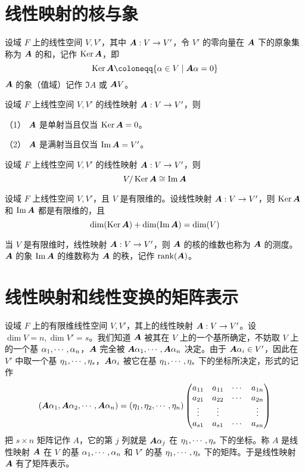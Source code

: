 \section{线性映射的核与象}

\begin{definition}[核] 
    设域 $F$ 上的线性空间 $V,V'$，其中 $\boldsymbol{A} : V \to V'$，令 $V'$ 的零向量在 $\boldsymbol{A}$ 下的原象集称为 $\boldsymbol{A}$ 的和，记作 $\operatorname{Ker} \boldsymbol{A}$，即
    \[ \Ker \bfA \coloneqq \{ \alpha \in V \mid \bfA\alpha = 0 \} \]
    $\boldsymbol{A}$ 的象（值域）记作 $\Im A$ 或 $\boldsymbol{A} V$。
\end{definition}

\begin{proposition}
    设域 $F$ 上线性空间 $V,V'$ 的线性映射 $\boldsymbol{A} : V \to V'$，则
    
    （1） $\boldsymbol{A}$ 是单射当且仅当 $\operatorname{Ker} \boldsymbol{A} = 0$。
    
    （2） $\boldsymbol{A}$ 是满射当且仅当 $\operatorname{Im} \boldsymbol{A} = V'$。
\end{proposition}

\begin{theorem}
    设域 $F$ 上线性空间 $V,V'$ 的线性映射 $\boldsymbol{A} : V \to V'$，则
    \[ V / \operatorname{Ker} \boldsymbol{A} \cong \operatorname{Im} \boldsymbol{A} \]
\end{theorem}

\begin{theorem}
    设域 $F$ 上线性空间 $V,V'$，且 $V$ 是有限维的。设线性映射 $\boldsymbol{A} : V \to V'$，则 $\operatorname{Ker} \boldsymbol{A}$ 和 $\operatorname{Im} \boldsymbol{A}$ 都是有限维的，且
    \[ \dim(\operatorname{Ker} \boldsymbol{A}) + \dim(\operatorname{Im} \boldsymbol{A}) = \dim(V) \]
\end{theorem}

当 $V$ 是有限维时，线性映射 $\boldsymbol{A} : V \to V'$，则 $\boldsymbol{A}$ 的核的维数也称为 $\boldsymbol{A}$ 的测度。$\boldsymbol{A}$ 的象 $\operatorname{Im} \boldsymbol{A}$ 的维数称为 $\boldsymbol{A}$ 的秩，记作 $\operatorname{rank}(\boldsymbol{A})$。

\section{线性映射和线性变换的矩阵表示}

设域 $F$ 上的有限维线性空间 $V,V'$，其上的线性映射 $\boldsymbol{A} : V \to V'$。设 $\dim V = n,\dim V' = s$。我们知道 $\boldsymbol{A}$ 被其在 $V$ 上的一个基所确定，不妨取 $V$ 上的一个基 $\alpha_1,\cdots,\alpha_n$，$\boldsymbol{A}$ 完全被 $\boldsymbol{A} \alpha_1,\cdots,\boldsymbol{A} \alpha_n$ 决定。由于 $\boldsymbol{A} \alpha_i \in V'$，因此在 $V'$ 中取一个基 $\eta_1,\cdots,\eta_s$，$\boldsymbol{A} \alpha_i$ 被它在基 $\eta_1,\cdots,\eta_s$ 下的坐标所决定，形式的记作
\[ 
    \left( \boldsymbol{A} \alpha_1 , \boldsymbol{A} \alpha_2 , \cdots , \boldsymbol{A} \alpha_n \right) = 
    \left( \eta_1 , \eta_2 , \cdots , \eta_n \right)
    \left( \begin{matrix}
            a_{11} & a_{11} & \cdots & a_{1n} \\
            a_{21} & a_{22} & \cdots & a_{2n} \\
            \vdots & \vdots &        & \vdots \\
            a_{s1} & a_{s1} & \cdots & a_{sn}
        \end{matrix} \right)
\]
把 $s\times n$ 矩阵记作 $A$，它的第 $j$ 列就是 $\boldsymbol{A} \alpha_j$ 在 $\eta_1,\cdots,\eta_s$ 下的坐标。称 $A$ 是线性映射 $\boldsymbol{A}$ 在 $V$ 的基 $\alpha_1,\cdots,\alpha_n$ 和 $V'$ 的基 $\eta_1,\cdots,\eta_s$ 下的矩阵。于是线性映射 $\boldsymbol{A}$ 有了矩阵表示。


